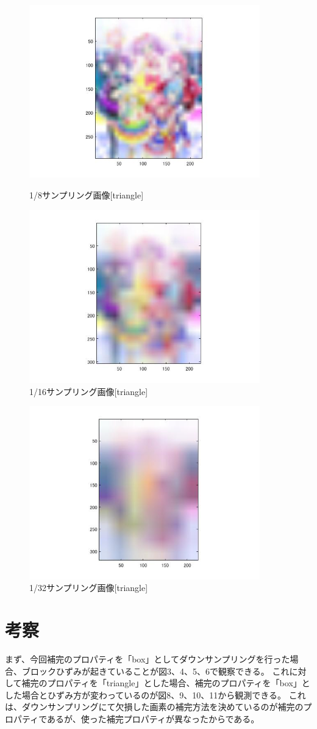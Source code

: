 \documentclass{jsarticle}
\begin{document}
 
\begin{figure}[htbp] 
 \begin{center}
  \includegraphics[width=10cm]{kadai1t-3.jpg}
 \end{center}
 \caption{1/8サンプリング画像[triangle]}
 \begin{center}
  \includegraphics[width=10cm]{kadai1t-4.jpg}
 \end{center}
 \caption{1/16サンプリング画像[triangle]}
\end{figure}

\begin{figure}[htbp] 
\begin{center}
  \includegraphics[width=10cm]{kadai1t-5.jpg}
 \end{center}
 \caption{1/32サンプリング画像[triangle]}
\end{figure}
\clearpage
\section{考察}
まず、今回補完のプロパティを「box」としてダウンサンプリングを行った場合、ブロックひずみが起きていることが図3、4、5、6で観察できる。
これに対して補完のプロパティを「triangle」とした場合、補完のプロパティを「box」とした場合とひずみ方が変わっているのが図8、9、10、11から観測できる。
これは、ダウンサンプリングにて欠損した画素の補完方法を決めているのが補完のプロパティであるが、使った補完プロパティが異なったからである。
\end{document}
